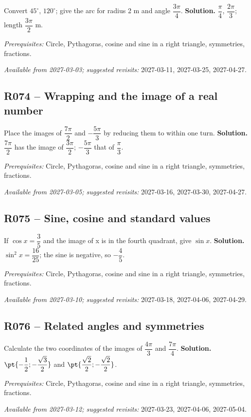 Convert $45^\circ$, $120^\circ$; give the arc for radius 2 m and angle $\dfrac{3\pi}{4}$.
\ifmxteacher\textbf{Solution.} $\dfrac{\pi}{4}$, $\dfrac{2\pi}{3}$; length $\dfrac{3\pi}{2}$ m.\par\textit{Prerequisites:} Circle, Pythagoras, cosine and sine in a right triangle, symmetries, fractions.\par\textit{Available from 2027-03-03; suggested revisits:} 2027-03-11, 2027-03-25, 2027-04-27.\fi
{}\subsection*{R074 -- Wrapping and the image of a real number}\label{R074}
Place the images of $\dfrac{7\pi}{2}$ and $-\dfrac{5\pi}{3}$ by reducing them to within one turn.
\ifmxteacher\textbf{Solution.} $\dfrac{7\pi}{2}$ has the image of $\dfrac{3\pi}{2}$; $-\dfrac{5\pi}{3}$ that of $\dfrac{\pi}{3}$.\par\textit{Prerequisites:} Circle, Pythagoras, cosine and sine in a right triangle, symmetries, fractions.\par\textit{Available from 2027-03-05; suggested revisits:} 2027-03-16, 2027-03-30, 2027-04-27.\fi
{}\subsection*{R075 -- Sine, cosine and standard values}\label{R075}
If $\cos x=\dfrac{3}{5}$ and the image of x is in the fourth quadrant, give $\sin x$.
\ifmxteacher\textbf{Solution.} $\sin ^2x=\dfrac{16}{25}$; the sine is negative, so $-\dfrac{4}{5}$.\par\textit{Prerequisites:} Circle, Pythagoras, cosine and sine in a right triangle, symmetries, fractions.\par\textit{Available from 2027-03-10; suggested revisits:} 2027-03-18, 2027-04-06, 2027-04-29.\fi
{}\subsection*{R076 -- Related angles and symmetries}\label{R076}
Calculate the two coordinates of the images of $\dfrac{4\pi}{3}$ and $\dfrac{7\pi}{4}$.
\ifmxteacher\textbf{Solution.} $\pt{-\dfrac{1}{2};-\dfrac{\sqrt 3}{2}}$ and $\pt{\dfrac{\sqrt 2}{2};-\dfrac{\sqrt 2}{2}}$.\par\textit{Prerequisites:} Circle, Pythagoras, cosine and sine in a right triangle, symmetries, fractions.\par\textit{Available from 2027-03-12; suggested revisits:} 2027-03-23, 2027-04-06, 2027-05-04.\fi
